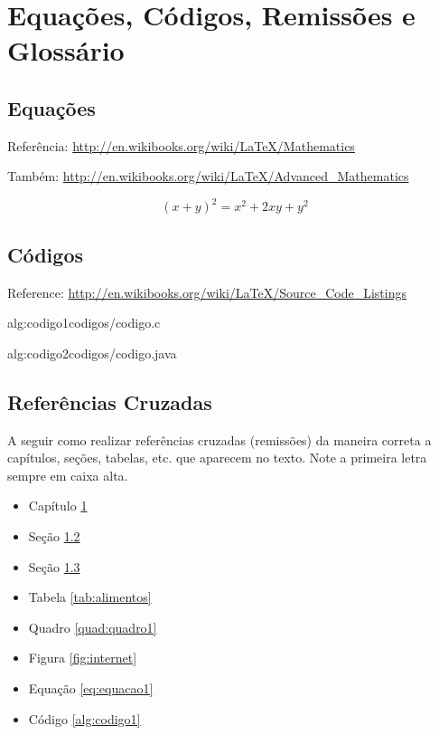 \chapter{Equações, Códigos,  Remissões e Glossário}
\label{chp:capitulo4}

\section{Equações}
\label{sec:equacoes}
Referência: \url{http://en.wikibooks.org/wiki/LaTeX/Mathematics}

Também: \url{http://en.wikibooks.org/wiki/LaTeX/Advanced_Mathematics}

\begin{equation}
  (x + y)^2 = x^2 + 2xy + y^2
  \label{eq:equacao1}
\end{equation}

\section{Códigos}
\label{sec:codigos}
Reference: \url{http://en.wikibooks.org/wiki/LaTeX/Source_Code_Listings}

 {alg:codigo1}{codigos/codigo.c}

 {alg:codigo2}{codigos/codigo.java}

\section{Referências Cruzadas}
\label{sec:referencias}

A seguir como realizar referências cruzadas (remissões) da maneira correta a capítulos, seções, tabelas, etc. que aparecem no texto. Note a primeira letra sempre em caixa alta. \\

\begin{itemize}
  \item Capítulo \ref{chp:capitulo4}
  \item Seção \ref{sec:codigos}
  \item Seção \ref{sec:referencias}
  \item Tabela \ref{tab:alimentos}
  \item Quadro \ref{quad:quadro1}
  \item Figura \ref{fig:internet}
  \item Equação \ref{eq:equacao1}
  \item Código \ref{alg:codigo1}
\end{itemize}


